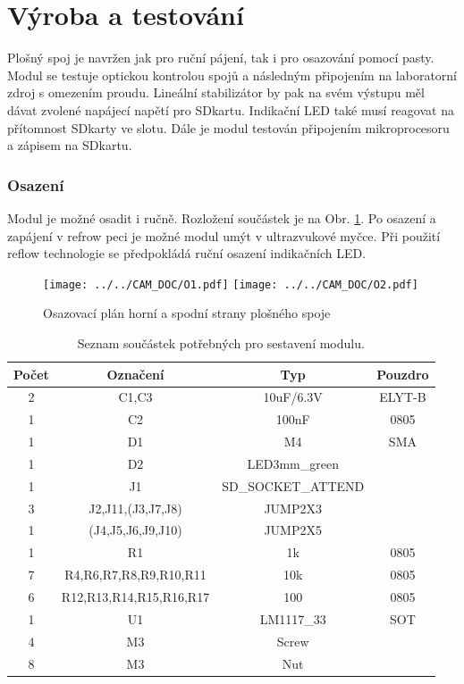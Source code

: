 \documentclass[12pt,a4paper,oneside]{article}
\begin{document}
\section{Výroba a testování}

Plošný spoj je navržen jak pro ruční pájení, tak i pro osazování pomocí pasty.  Modul se testuje optickou kontrolou spojů a následným připojením na laboratorní zdroj s omezením proudu. Lineální stabilizátor by pak na svém výstupu měl dávat zvolené napájecí napětí pro SDkartu. Indikační LED také musí reagovat na přítomnost SDkarty ve slotu. 
Dále je modul testován připojením mikroprocesoru a zápisem na SDkartu.

\subsubsection{Osazení}

Modul je možné osadit i ručně. Rozložení součástek je na Obr. \ref{fig:osazovaci_plan}. Po osazení a zapájení v refrow peci je možné modul umýt v ultrazvukové myčce.  Při použití reflow technologie se předpokládá ruční osazení indikačních LED.

\newpage

\begin{figure} [h!tbp]
  \centering
  \texttt{[image: ../../CAM\_DOC/O1.pdf]}
  \texttt{[image: ../../CAM\_DOC/O2.pdf]}
  \caption{Osazovací plán horní a spodní strany plošného spoje}
  \label{fig:osazovaci_plan}
\end{figure}

\begin{savenotes}
\begin{table}[h!]
\begin{center}
\begin{tabular}{ |c|c|c|c| }
\hline 
Počet & Označení & Typ  & Pouzdro  \\ 
\hline 
2	&	C1,C3	&	10uF/6.3V	&	ELYT-B	\\
1	&	C2	&	100nF	&	0805	\\
1	&	D1	&	M4	&	SMA	\\
1	&	D2	&	LED3mm\_green	&		\\
1	&	J1	&	SD\_SOCKET\_ATTEND	&		\\
3	&	J2,J11,(J3,J7,J8)	&	JUMP2X3	&		\\
1	&	(J4,J5,J6,J9,J10)	&	JUMP2X5	&		\\
1	&	R1	&	1k	&	0805	\\
7	&	R4,R6,R7,R8,R9,R10,R11	&	10k	&	0805	\\
6	&	R12,R13,R14,R15,R16,R17	&	100	&	0805	\\
1	&	U1	&	LM1117\_33	&	SOT	\\
4	&	M3 	&	Screw	&		\\
8	&	M3 	&	Nut	&		\\
\hline 
\end{tabular}
\end{center}
\caption{Seznam součástek potřebných pro sestavení modulu.}
\label{seznam_soucastek}
\end{table}
\end{savenotes}
\end{document}
